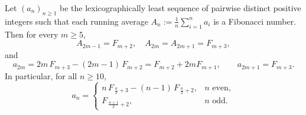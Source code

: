 \begin{theorem}\label{thm:fib-full}
Let $(a_n)_{n\ge1}$ be the lexicographically least sequence of pairwise distinct positive integers such that each running average $A_n:=\tfrac{1}{n}\sum_{i=1}^n a_i$ is a Fibonacci number. Then for every $m\ge5$,
\[
 A_{2m-1}=F_{m+2},\quad A_{2m}=A_{2m+1}=F_{m+3},
\]
and
\[
 a_{2m}=2m\,F_{m+3}-(2m-1)\,F_{m+2}=F_{m+2}+2mF_{m+1},\qquad
 a_{2m+1}=F_{m+3}.
\]
In particular, for all $n\ge10$,
\[
 a_n=
 \begin{cases}
 n\,F_{\,\frac n2+3}-(n-1)\,F_{\,\frac n2+2}, & n\text{ even},\\[4pt]
 F_{\,\frac{n+1}{2}+2}, & n\text{ odd}.
 \end{cases}
\]
\end{theorem}

